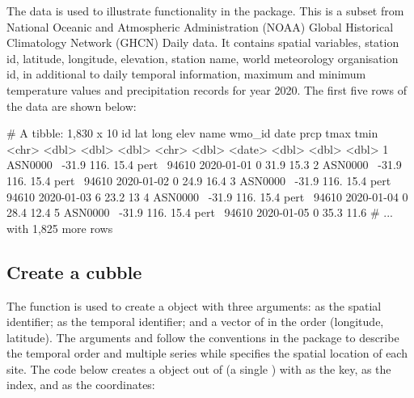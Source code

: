 \documentclass[
  shortnames]{jss}
\begin{document}
The data  is used to illustrate functionality in the  package. This is a subset from National Oceanic and Atmospheric Administration (NOAA) \citep{noaa} Global Historical Climatology Network (GHCN) Daily data. It contains spatial variables, station id, latitude, longitude, elevation, station name, world meteorology organisation id, in additional to daily temporal information, maximum and minimum temperature values and precipitation records for year 2020. The first five rows of the data are shown below:

\begin{CodeChunk}
\begin{CodeOutput}
# A tibble: 1,830 x 10
  id         lat  long  elev name  wmo_id date        prcp  tmax  tmin
  <chr>    <dbl> <dbl> <dbl> <chr>  <dbl> <date>     <dbl> <dbl> <dbl>
1 ASN0000~ -31.9  116.  15.4 pert~  94610 2020-01-01     0  31.9  15.3
2 ASN0000~ -31.9  116.  15.4 pert~  94610 2020-01-02     0  24.9  16.4
3 ASN0000~ -31.9  116.  15.4 pert~  94610 2020-01-03     6  23.2  13  
4 ASN0000~ -31.9  116.  15.4 pert~  94610 2020-01-04     0  28.4  12.4
5 ASN0000~ -31.9  116.  15.4 pert~  94610 2020-01-05     0  35.3  11.6
# ... with 1,825 more rows
\end{CodeOutput}
\end{CodeChunk}

\hypertarget{create}{%
\subsection{Create a cubble}\label{create}}

The function  is used to create a  object with three arguments:  as the spatial identifier;  as the temporal identifier; and a vector of  in the order (longitude, latitude). The arguments  and  follow the conventions in the  package to describe the temporal order and multiple series while  specifies the spatial location of each site. The code below creates a  object out of  (a single ) with  as the key,  as the index, and  as the coordinates:
\end{document}
